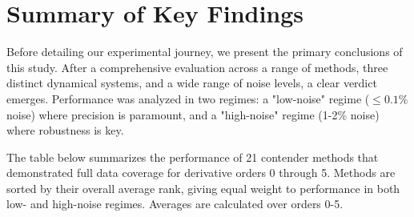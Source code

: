 \section{Summary of Key Findings}
\label{sec:summary}

Before detailing our experimental journey, we present the primary conclusions of this study. After a comprehensive evaluation across a range of methods, three distinct dynamical systems, and a wide range of noise levels, a clear verdict emerges. Performance was analyzed in two regimes: a "low-noise" regime ($\le 0.1\%$ noise) where precision is paramount, and a "high-noise" regime (1-2\% noise) where robustness is key.

The table below summarizes the performance of 21 contender methods that demonstrated full data coverage for derivative orders 0 through 5. Methods are sorted by their overall average rank, giving equal weight to performance in both low- and high-noise regimes. Averages are calculated over orders 0-5.

